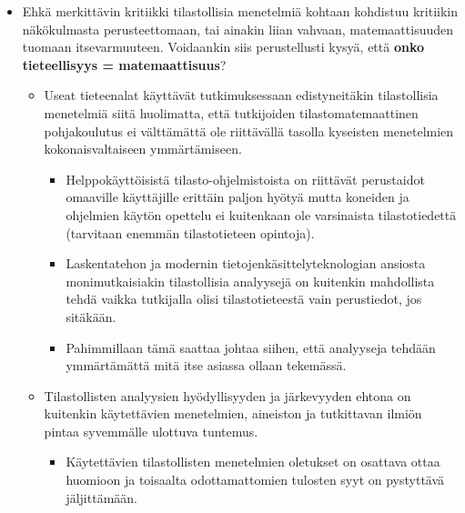 \documentclass[
]{book}
\providecommand{\tightlist}{%
  \setlength{\itemsep}{0pt}\setlength{\parskip}{0pt}}
\begin{document}
\begin{itemize}
\tightlist
\item
  Ehkä merkittävin kritiikki tilastollisia menetelmiä kohtaan kohdistuu kritiikin näkökulmasta perusteettomaan, tai ainakin liian vahvaan, matemaattisuuden tuomaan itsevarmuuteen. Voidaankin siis perustellusti kysyä, että \textbf{onko tieteellisyys = matemaattisuus}?

  \begin{itemize}
  \tightlist
  \item
    Useat tieteenalat käyttävät tutkimuksessaan edistyneitäkin tilastollisia menetelmiä siitä huolimatta, että tutkijoiden tilastomatemaattinen pohjakoulutus ei välttämättä ole riittävällä tasolla kyseisten menetelmien kokonaisvaltaiseen ymmärtämiseen.

    \begin{itemize}
    \tightlist
    \item
      Helppokäyttöisistä tilasto-ohjelmistoista on riittävät perustaidot omaaville käyttäjille erittäin paljon hyötyä mutta koneiden ja ohjelmien käytön opettelu ei kuitenkaan ole varsinaista tilastotiedettä (tarvitaan enemmän tilastotieteen opintoja).
    \item
      Laskentatehon ja modernin tietojenkäsittelyteknologian ansiosta monimutkaisiakin tilastollisia analyysejä on kuitenkin mahdollista tehdä vaikka tutkijalla olisi tilastotieteestä vain perustiedot, jos sitäkään.
    \item
      Pahimmillaan tämä saattaa johtaa siihen, että analyyseja tehdään ymmärtämättä mitä itse asiassa ollaan tekemässä.
    \end{itemize}
  \item
    Tilastollisten analyysien hyödyllisyyden ja järkevyyden ehtona on kuitenkin käytettävien menetelmien, aineiston ja tutkittavan ilmiön pintaa syvemmälle ulottuva tuntemus.

    \begin{itemize}
    \tightlist
    \item
      Käytettävien tilastollisten menetelmien oletukset on osattava ottaa huomioon ja toisaalta odottamattomien tulosten syyt on pystyttävä jäljittämään.


\end{itemize}
\end{itemize}
\end{itemize}
\end{document}
